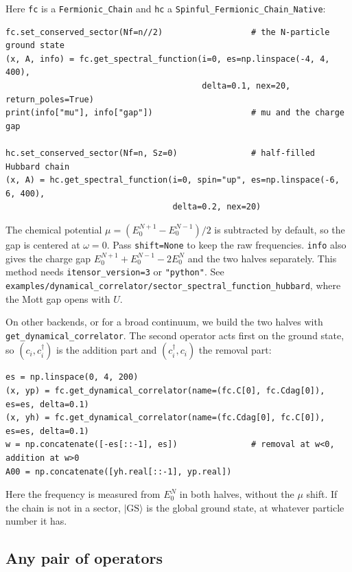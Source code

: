 \documentclass[11pt]{article}
\begin{document}
Here \texttt{fc} is a \texttt{Fermionic\_\allowbreak{}Chain} and \texttt{hc} a
\texttt{Spinful\_\allowbreak{}Fermionic\_\allowbreak{}Chain\_\allowbreak{}Native}:

\begin{lstlisting}
fc.set_conserved_sector(Nf=n//2)                  # the N-particle ground state
(x, A, info) = fc.get_spectral_function(i=0, es=np.linspace(-4, 4, 400),
                                        delta=0.1, nex=20, return_poles=True)
print(info["mu"], info["gap"])                    # mu and the charge gap

hc.set_conserved_sector(Nf=n, Sz=0)               # half-filled Hubbard chain
(x, A) = hc.get_spectral_function(i=0, spin="up", es=np.linspace(-6, 6, 400),
                                  delta=0.2, nex=20)
\end{lstlisting}

The chemical potential \(\mu=(E_0^{N+1}-E_0^{N-1})/2\) is subtracted by
default, so the gap is centered at \(\omega=0\). Pass \texttt{shift=None} to keep
the raw frequencies. \texttt{info} also gives the charge gap
\(E_0^{N+1}+E_0^{N-1}-2E_0^N\) and the two halves separately. This method
needs \texttt{itensor\_\allowbreak{}version=3} or \texttt{"python"}. See
\texttt{examples/dynamical\_\allowbreak{}correlator/sector\_\allowbreak{}spectral\_\allowbreak{}function\_\allowbreak{}hubbard}, where the
Mott gap opens with \(U\).

On other backends, or for a broad continuum, we build the two halves with
\texttt{get\_\allowbreak{}dynamical\_\allowbreak{}correlator}. The second operator acts first on the ground
state, so \((c_i,c_i^\dagger)\) is the addition part and
\((c_i^\dagger,c_i)\) the removal part:

\begin{lstlisting}
es = np.linspace(0, 4, 200)
(x, yp) = fc.get_dynamical_correlator(name=(fc.C[0], fc.Cdag[0]), es=es, delta=0.1)
(x, yh) = fc.get_dynamical_correlator(name=(fc.Cdag[0], fc.C[0]), es=es, delta=0.1)
w = np.concatenate([-es[::-1], es])               # removal at w<0, addition at w>0
A00 = np.concatenate([yh.real[::-1], yp.real])
\end{lstlisting}

Here the frequency is measured from \(E_0^N\) in both halves, without the
\(\mu\) shift. If the chain is not in a sector, \(|\mathrm{GS}\rangle\) is the
global ground state, at whatever particle number it has.

\subsection{Any pair of operators}
\end{document}
